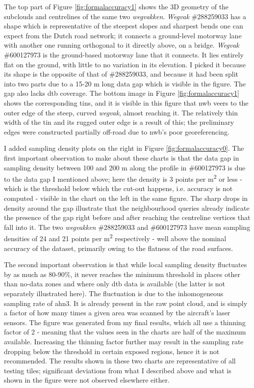 The top part of Figure \ref{fig:formalaccuracy1} shows the 3D geometry of the subclouds and centrelines of the same two \textit{wegvakken}. \textit{Wegvak} \#288259033 has a shape which is representative of the steepest slopes and sharpest bends one can expect from the Dutch road network; it connects a ground-level motorway lane with another one running orthogonal to it directly above, on a bridge. \textit{Wegvak} \#600127973 is the ground-based motorway lane that it connects. It lies entirely flat on the ground, with little to no variation in its elevation. I picked it because its shape is the opposite of that of \#288259033, and because it had been split into two parts due to a 15-20 m long data gap which is visible in the figure. The gap also lacks \ac{dtb} coverage. The bottom image in Figure \ref{fig:formalaccuracy1} shows the corresponding \ac{tin}s, and it is visible in this figure that \ac{nwb} veers to the outer edge of the steep, curved \textit{wegvak}, almost reaching it. The relatively thin width of the \ac{tin} and its rugged outer edge is a result of this; the preliminary edges were constructed partially off-road due to \ac{nwb}'s poor georeferencing.

I added sampling density plots on the right in Figure \ref{fig:formalaccuracy0}. The first important observation to make about these charts is that the data gap in sampling density between 100 and 200 m along the profile in \#600127973 is due to the data gap I mentioned above; here the density is 3 points per m\textsuperscript{2} or less - which is the threshold below which the cut-out happens, i.e. accuracy is not computed - visible in the chart on the left in the same figure. The sharp drops in density around the gap illustrate that the neighbourhood queries already indicate the presence of the gap right before and after reaching the centreline vertices that fall into it. The two \textit{wegvakken} \#288259033 and \#600127973 have mean sampling densities of 24 and 21 points per m\textsuperscript{2} respectively - well above the nominal accuracy of the dataset, primarily owing to the flatness of the road surfaces.

The second important observation is that while local sampling density fluctuates by as much as 80-90\%, it never reaches the minimum threshold in places other than no-data zones and where only \ac{dtb} data is available (the latter is not separately illustrated here). The fluctuation is due to the inhomogeneous sampling rate of \ac{ahn3}. It is already present in the raw point cloud, and is simply a factor of how many times a given area was scanned by the aircraft's laser sensors. The figure was generated from my final results, which all use a thinning factor of 2 - meaning that the values seen in the charts are half of the maximum available. Increasing the thinning factor further may result in the sampling rate dropping below the threshold in certain exposed regions, hence it is not recommended. The results shown in these two charts are representative of all testing tiles; significant deviations from what I described above and what is shown in the figure were not observed elsewhere either.

